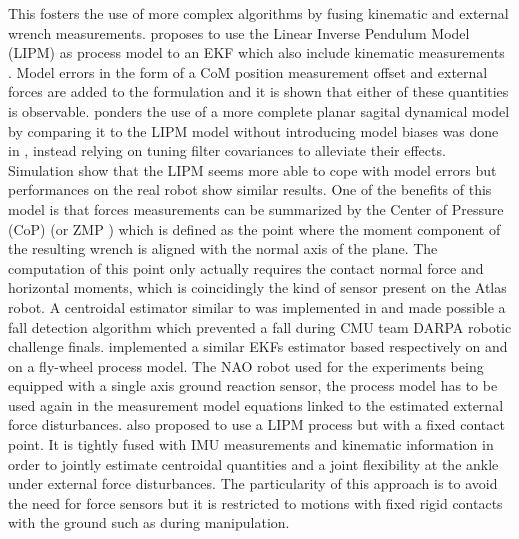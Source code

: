 This fosters the use of more complex algorithms by fusing kinematic and external wrench measurements. \cite{stephens2011state} proposes to use the 
Linear Inverse Pendulum Model (LIPM) as process model to an EKF which also include kinematic measurements . Model errors in the form of a CoM position measurement offset and external forces are added to the formulation and it is shown that
either of these quantities is observable. \cite{atkeson2012state} ponders the use of a more complete planar sagital dynamical model by comparing it to the LIPM model
without introducing model biases was done in \cite{stephens2011state}, instead relying on tuning filter covariances to alleviate their effects. 
Simulation show that the LIPM seems more able to cope with model errors but performances on the real robot show similar results. 
One of the benefits of this model is that forces measurements can be summarized by the Center of Pressure (CoP) 
(or ZMP \cite{sardain2004forces}) which is defined as the point where the moment component of the resulting wrench is aligned with the normal axis of the plane.
The computation of this point only actually requires the contact normal force and horizontal moments, which is coincidingly the kind of
sensor present on the Atlas robot. A centroidal estimator similar to \cite{stephens2011state} was implemented in \cite{xinjilefu2015center} and made possible
a fall detection algorithm which prevented a fall during CMU team DARPA robotic challenge finals. \cite{piperakis2016non, piperakis2018nonlinear} implemented a similar 
EKFs estimator based respectively on and on a fly-wheel process model. The NAO robot used for the experiments being equipped with a single axis ground reaction sensor,
the process model has to be used again in the measurement model equations linked to the estimated external force disturbances.   
\cite{benallegue2015estimation} also proposed to use a LIPM process but with a fixed contact point. It is tightly fused with IMU 
measurements and kinematic information in order to jointly estimate centroidal quantities 
and a joint flexibility at the ankle under external force disturbances. The particularity of this approach is to avoid the need for force sensors but
it is restricted to motions with fixed rigid contacts with the ground such as during manipulation.

